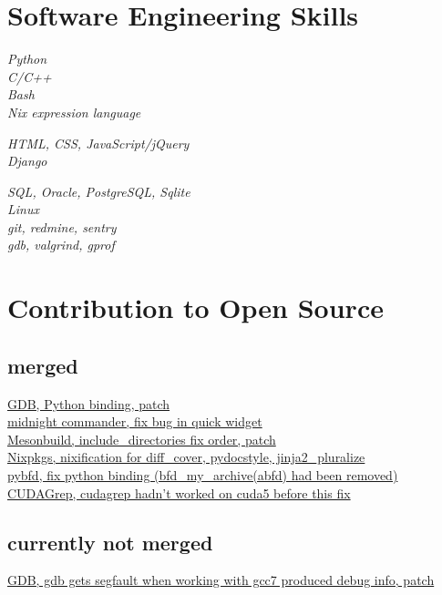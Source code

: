 \documentclass[10pt]{article} %
\begin{document}

\section{Software Engineering Skills}

{
\textit{Python}\\
\textit{C/C++}\\
\textit{Bash}\\
\textit{Nix expression language}
}


{
\textit{HTML, CSS, JavaScript/jQuery}\\
\textit{Django}\\
}


{
\textit{SQL, Oracle, PostgreSQL, Sqlite}\\
\textit{Linux}\\
\textit{git, redmine, sentry}\\
\textit{gdb, valgrind, gprof}
}

\section{Contribution to Open Source}

\subsection{merged}
\href{https://github.com/bminor/binutils-gdb/commit/484d8d361de65a8489252d14511b77c142d859a1}{GDB, Python binding, patch}\\
\href{http://midnight-commander.org/ticket/3870?cversion=0&cnum_hist=1}{midnight commander, fix bug in quick widget}\\
\href{https://github.com/mesonbuild/meson/pull/2976}{Mesonbuild, include\_directories fix order, patch}\\
\href{https://github.com/NixOS/nixpkgs/pull/33715}{Nixpkgs, nixification for diff\_cover, pydocstyle, jinja2\_pluralize}\\
\href{https://github.com/orivej/pybfd/commit/f5ed88590c66a3570b7e5b9aa4c723c40686271d}{pybfd, fix python binding (bfd\_my\_archive(abfd) had been removed)}\\
\href{https://github.com/dzabraev/CUDA-grep/commit/79f4fddfab3cc7950cbe6c9b3a54bcb2b87dc3cc}{CUDAGrep, cudagrep hadn't worked on cuda5 before this fix}

\subsection{currently not merged}

\href{https://sourceware.org/ml/gdb-patches/2018-01/msg00415.html}{GDB, gdb gets segfault when working with gcc7 produced debug info, patch}


\end{document}
